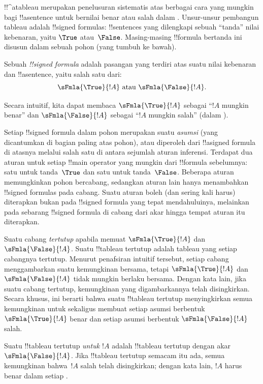 \documentclass[../../../include/open-logic-section]{subfiles}
\begin{document}
{}
{}


!!^a{tableau} merupakan penelusuran sistematis atas berbagai cara yang
mungkin bagi !!a{sentence} untuk bernilai benar atau salah dalam
. Unsur-unsur pembangun
tableau adalah !!{signed formula}s:
!!{sentence}s yang dilengkapi sebuah ``tanda'' nilai kebenaran, yaitu
$\True$ atau~$\False$. Masing-masing !!{formula} bertanda ini disusun
dalam sebuah pohon (yang tumbuh ke bawah).

\begin{defn}
  Sebuah \emph{!!{signed formula}} adalah pasangan yang terdiri atas
  suatu nilai kebenaran dan !!a{sentence}, yaitu salah satu dari:
  \[
  \sFmla{\True}{!A} \text{ atau } \sFmla{\False}{!A}.
  \]
\end{defn}

Secara intuitif, kita dapat membaca $\sFmla{\True}{!A}$ sebagai
``$!A$ mungkin benar'' dan $\sFmla{\False}{!A}$ sebagai ``$!A$ mungkin
salah'' (dalam ).

Setiap !!{signed formula} dalam pohon merupakan suatu \emph{asumsi}
(yang dicantumkan di bagian paling atas pohon), atau diperoleh dari
!!a{signed formula} di atasnya melalui salah satu di antara sejumlah
aturan inferensi. Terdapat dua aturan untuk setiap !!{main operator}
yang mungkin dari !!{formula} sebelumnya: satu untuk tanda~$\True$ dan
satu untuk tanda~$\False$. Beberapa aturan memungkinkan pohon bercabang,
sedangkan aturan lain hanya menambahkan !!{signed formula}s pada cabang.
Suatu aturan boleh (dan sering kali harus) diterapkan bukan pada
!!{signed formula} yang tepat mendahuluinya, melainkan pada sebarang
!!{signed formula} di cabang dari akar hingga tempat aturan itu
diterapkan.

Suatu cabang \emph{tertutup} apabila memuat $\sFmla{\True}{!A}$ dan
$\sFmla{\False}{!A}$. Suatu !!{tableau} tertutup adalah tableau yang setiap
cabangnya tertutup. Menurut penafsiran intuitif tersebut, setiap cabang
menggambarkan suatu kemungkinan bersama, tetapi $\sFmla{\True}{!A}$ dan
$\sFmla{\False}{!A}$ tidak mungkin berlaku bersama. Dengan kata lain,
jika suatu cabang tertutup, kemungkinan yang digambarkannya telah
disingkirkan. Secara khusus, ini berarti bahwa suatu !!{tableau} tertutup
menyingkirkan semua kemungkinan untuk sekaligus membuat setiap asumsi
berbentuk $\sFmla{\True}{!A}$ benar dan setiap asumsi berbentuk
$\sFmla{\False}{!A}$ salah.

Suatu !!{tableau} tertutup \emph{untuk $!A$} adalah !!{tableau} tertutup
dengan akar~$\sFmla{\False}{!A}$. Jika !!{tableau} tertutup semacam itu
ada, semua kemungkinan bahwa~$!A$ salah telah disingkirkan; dengan kata
lain, $!A$ harus benar dalam setiap
.
\end{document}
